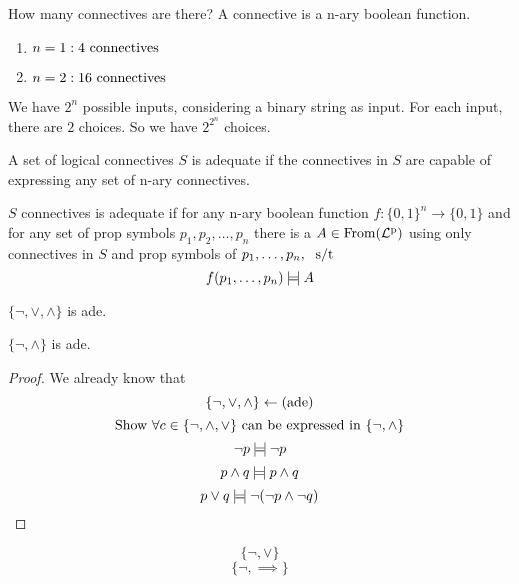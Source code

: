 \documentclass[12pt]{article}
\begin{document}
How many connectives are there? A connective is a n-ary boolean function.

\begin{enumerate}
    \item \(n=1:4\text{ connectives}\)
    \item \(n=2:16\text{ connectives}\)
\end{enumerate}

We have \(2^n\) possible inputs, considering a binary string as input. For each input,
there are \(2\) choices. So we have \(2^{2^n}\) choices.



\bboxdefn
\begin{defn}
    A set of logical connectives \(S\) is adequate if the connectives in \(S\) 
    are capable of expressing any set of n-ary connectives.
\end{defn}
\ebox

\bboxdefn
\begin{defn}
    \(S\) connectives is adequate if for any n-ary boolean function \(f:\{0,1\}^n\to\{0,1\}\)
    and for any set of prop symbols \(p_1,p_2,\dots,p_n\) there is a 
    \(A\in\mathrm{From}(\mathrm{\mathcal{L}^p_{}})\) using only connectives in \(S\) and prop symbols of
    \(p_1,\dots,p_n,\;\text{ s/t }\)
    \[
        f(p_1,\dots,p_n)\mathbin{\mid\!=\!\mid} A
    \]
\end{defn}
\ebox

\bboxthm
\begin{thm}
    \(\{\neg,\lor,\land\}\) is ade.
\end{thm}
\ebox


\bboxthm
\begin{thm}
    \(\{\neg,\land\}\) is ade.
\end{thm}
\ebox

\bboxproof
\begin{proof}
    We already know that
    \[
        \{\neg,\lor,\land\}\leftarrow(\mathrm{ade})
    \]
    \[
        \text{Show }\forall c\in\{\neg,\land,\lor\}\text{ can be expressed in }
        \{\neg,\land\}
    \]
    \[
        \neg p\mathbin{\mid\!=\!\mid}\neg p
    \]
    \[
        p\land q\mathbin{\mid\!=\!\mid} p\land q
    \]
    \[
        p\lor q\mathbin{\mid\!=\!\mid}\neg(\neg p\land\neg q)
    \]
\end{proof}
\ebox


\bboxthm
\begin{thm}
    \[\{\neg,\lor\}\]
    \[
        \{\neg,\implies\}
    \]
\end{thm}
\ebox
\end{document}
